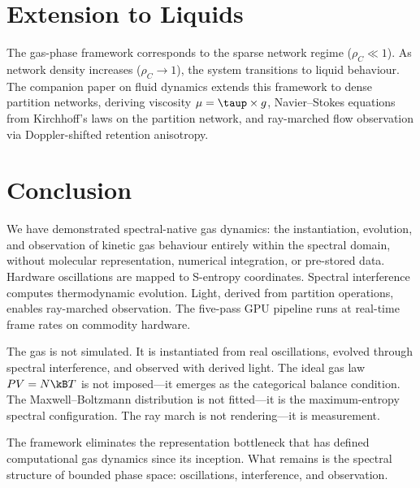 \section{Extension to Liquids}
\label{sec:extension}

The gas-phase framework corresponds to the sparse network regime ($\rho_C \ll 1$). As network density increases ($\rho_C \to 1$), the system transitions to liquid behaviour. The companion paper on fluid dynamics extends this framework to dense partition networks, deriving viscosity $\mu = \taup \times g$, Navier--Stokes equations from Kirchhoff's laws on the partition network, and ray-marched flow observation via Doppler-shifted retention anisotropy.

\section{Conclusion}
\label{sec:conclusion}

We have demonstrated spectral-native gas dynamics: the instantiation, evolution, and observation of kinetic gas behaviour entirely within the spectral domain, without molecular representation, numerical integration, or pre-stored data. Hardware oscillations are mapped to S-entropy coordinates. Spectral interference computes thermodynamic evolution. Light, derived from partition operations, enables ray-marched observation. The five-pass GPU pipeline runs at real-time frame rates on commodity hardware.

The gas is not simulated. It is instantiated from real oscillations, evolved through spectral interference, and observed with derived light. The ideal gas law $PV = N\kB T$ is not imposed---it emerges as the categorical balance condition. The Maxwell--Boltzmann distribution is not fitted---it is the maximum-entropy spectral configuration. The ray march is not rendering---it is measurement.

The framework eliminates the representation bottleneck that has defined computational gas dynamics since its inception. What remains is the spectral structure of bounded phase space: oscillations, interference, and observation.

